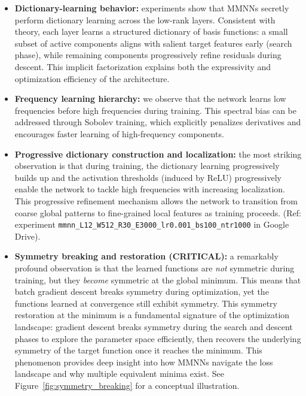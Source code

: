 \documentclass[12pt]{article}
\begin{document}
\begin{itemize}
    \item \textbf{Dictionary-learning behavior:} experiments show that MMNNs secretly perform dictionary learning across the low-rank layers. Consistent with theory, each layer learns a structured dictionary of basis functions: a small subset of active components aligns with salient target features early (search phase), while remaining components progressively refine residuals during descent. This implicit factorization explains both the expressivity and optimization efficiency of the architecture.\\
    
    \item \textbf{Frequency learning hierarchy:} we observe that the network learns low frequencies before high frequencies during training. This spectral bias can be addressed through Sobolev training, which explicitly penalizes derivatives and encourages faster learning of high-frequency components.\\
    
    \item \textbf{Progressive dictionary construction and localization:} the most striking observation is that during training, the dictionary learning progressively builds up and the activation thresholds (induced by ReLU) progressively enable the network to tackle high frequencies with increasing localization. This progressive refinement mechanism allows the network to transition from coarse global patterns to fine-grained local features as training proceeds. (Ref: experiment \texttt{mmnn\_L12\_W512\_R30\_E3000\_lr0.001\_bs100\_ntr1000} in Google Drive).\\
    
    \item \textbf{Symmetry breaking and restoration (CRITICAL):} a remarkably profound observation is that the learned functions are \emph{not} symmetric during training, but they \emph{become} symmetric at the global minimum. This means that batch gradient descent breaks symmetry during optimization, yet the functions learned at convergence still exhibit symmetry. This symmetry restoration at the minimum is a fundamental signature of the optimization landscape: gradient descent breaks symmetry during the search and descent phases to explore the parameter space efficiently, then recovers the underlying symmetry of the target function once it reaches the minimum. This phenomenon provides deep insight into how MMNNs navigate the loss landscape and why multiple equivalent minima exist. See Figure~\ref{fig:symmetry_breaking} for a conceptual illustration.\\
    

\end{itemize}
\end{document}
